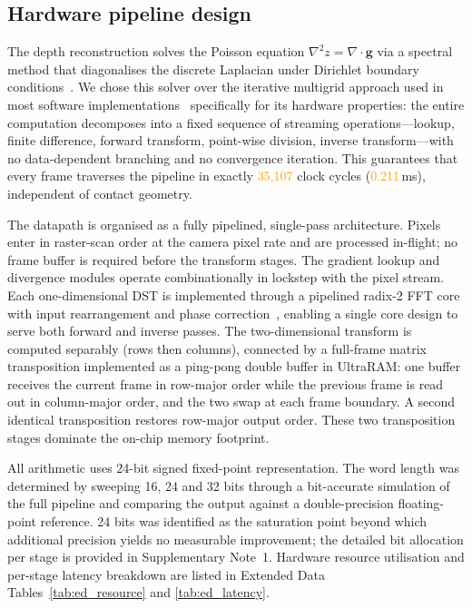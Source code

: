 \documentclass[10pt,a4paper]{article}
\newcommand{\placeholder}[1]{\textcolor{orange}{#1}}
\newcommand{\totalCyc}{\placeholder{35{,}107}}
\begin{document}
\subsection*{Hardware pipeline design}

The depth reconstruction solves the Poisson equation $\nabla^2 z = \nabla \cdot \mathbf{g}$ via a spectral method that diagonalises the discrete Laplacian under Dirichlet boundary conditions~\cite{strang2007cse}. We chose this solver over the iterative multigrid approach used in most software implementations~\cite{yuan2017gelsight} specifically for its hardware properties: the entire computation decomposes into a fixed sequence of streaming operations---lookup, finite difference, forward transform, point-wise division, inverse transform---with no data-dependent branching and no convergence iteration. This guarantees that every frame traverses the pipeline in exactly \totalCyc{} clock cycles (\placeholder{0.211}\,ms), independent of contact geometry.

The datapath is organised as a fully pipelined, single-pass architecture. Pixels enter in raster-scan order at the camera pixel rate and are processed in-flight; no frame buffer is required before the transform stages. The gradient lookup and divergence modules operate combinationally in lockstep with the pixel stream. Each one-dimensional DST is implemented through a pipelined radix-2 FFT core with input rearrangement and phase correction~\cite{makhoul1980fct}, enabling a single core design to serve both forward and inverse passes. The two-dimensional transform is computed separably (rows then columns), connected by a full-frame matrix transposition implemented as a ping-pong double buffer in UltraRAM: one buffer receives the current frame in row-major order while the previous frame is read out in column-major order, and the two swap at each frame boundary. A second identical transposition restores row-major output order. These two transposition stages dominate the on-chip memory footprint.

All arithmetic uses 24-bit signed fixed-point representation. The word length was determined by sweeping 16, 24 and 32 bits through a bit-accurate simulation of the full pipeline and comparing the output against a double-precision floating-point reference. 24 bits was identified as the saturation point beyond which additional precision yields no measurable improvement; the detailed bit allocation per stage is provided in Supplementary Note~1. Hardware resource utilisation and per-stage latency breakdown are listed in Extended Data Tables~\ref{tab:ed_resource} and \ref{tab:ed_latency}.
\end{document}
